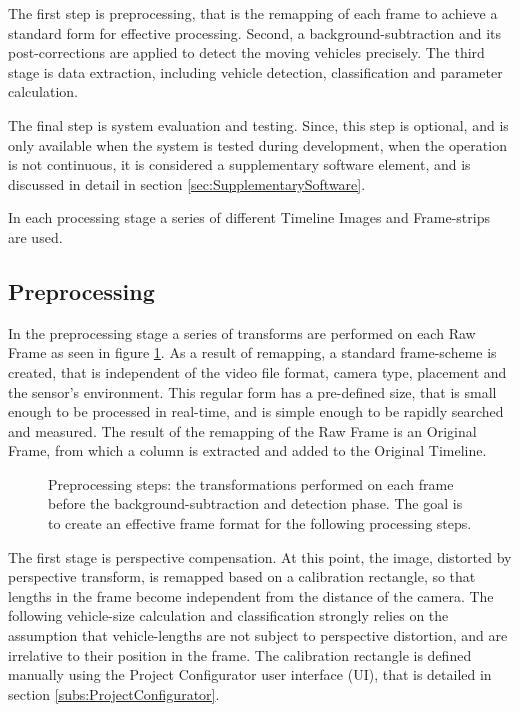 
The first step is preprocessing, that is the remapping of each frame to achieve a standard form for effective processing.
Second, a background-subtraction and its post-corrections are applied to detect the moving vehicles precisely.
The third stage is data extraction, including vehicle detection, classification and parameter calculation.

The final step is system evaluation and testing. 
Since, this step is optional, and is only available when the system is tested during development, when the operation is not continuous, it is considered a supplementary software element, and is discussed in detail in section \ref{sec:SupplementarySoftware}.

In each processing stage a series of different Timeline Images and Frame-strips are used.
\subsection{Preprocessing}
In the preprocessing stage a series of transforms are performed on each Raw Frame as seen in figure \ref{fig:transforms}.
As a result of remapping, a standard frame-scheme is created, that is independent of the video file format, camera type, placement and the sensor's environment.
This regular form has a pre-defined size, that is small enough to be processed in real-time, and is simple enough to be rapidly searched and measured.
The result of the remapping of the Raw Frame is an Original Frame, from which a column is extracted and added to the Original Timeline.

\begin{figure}[!h]
	\centering
	
	\caption{Preprocessing steps: the transformations performed on each frame before the background-subtraction and detection phase. The goal is to create an effective frame format for the following processing steps.\label{fig:transforms}}
\end{figure}

The first stage is perspective compensation.
At this point, the image, distorted by perspective transform, is remapped based on a calibration rectangle, so that lengths in the frame become independent from the distance of the camera.
The following vehicle-size calculation and classification strongly relies on the assumption that vehicle-lengths are not subject to perspective distortion, and are irrelative to their position in the frame.
The calibration rectangle is defined manually using the Project Configurator user interface (UI), that is detailed in section \ref{subs:ProjectConfigurator}.

